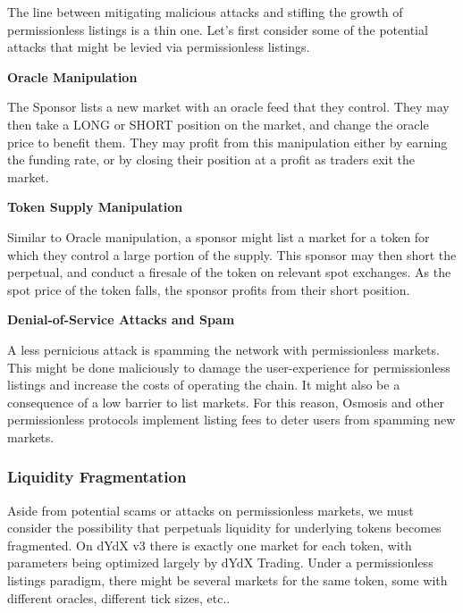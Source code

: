             The line between mitigating malicious attacks and stifling the growth of permissionless listings is a thin one. Let's first consider some of the potential attacks that might be levied via permissionless listings.

            \textbf{Oracle Manipulation}

            The Sponsor lists a new market with an oracle feed that they control. They may then take a LONG or SHORT position on the market, and change the oracle price to benefit them. They may profit from this manipulation either by earning the funding rate, or by closing their position at a profit as traders exit the market.

            \textbf{Token Supply Manipulation}

            Similar to Oracle manipulation, a sponsor might list a market for a token for which they control a large portion of the supply. This sponsor may then short the perpetual, and conduct a firesale of the token on relevant spot exchanges. As the spot price of the token falls, the sponsor profits from their short position.

            \textbf{Denial-of-Service Attacks and Spam}

            A less pernicious attack is spamming the network with permissionless markets. This might be done maliciously to damage the user-experience for permissionless listings and increase the costs of operating the chain. It might also be a consequence of a low barrier to list markets. For this reason, Osmosis and other permissionless protocols implement listing fees to deter users from spamming new markets.

        \subsubsection{Liquidity Fragmentation}

            Aside from potential scams or attacks on permissionless markets, we must consider the possibility that perpetuals liquidity for underlying tokens becomes fragmented. On dYdX v3 there is exactly one market for each token, with parameters being optimized largely by dYdX Trading. Under a permissionless listings paradigm, there might be several markets for the same token, some with different oracles, different tick sizes, etc.. 

